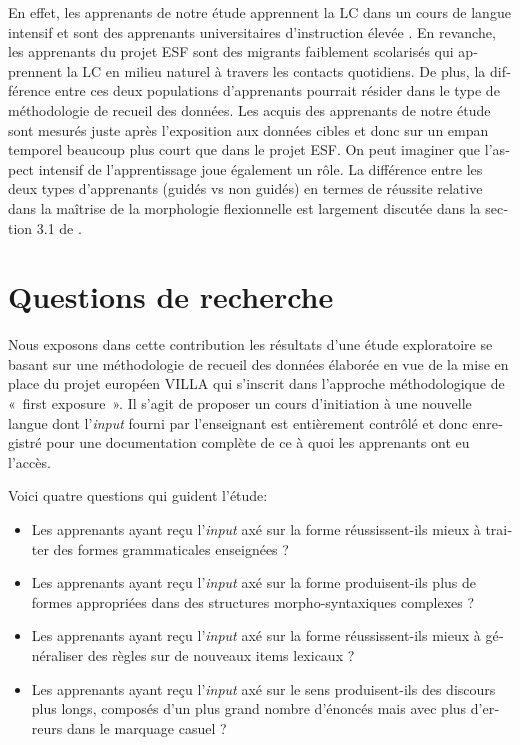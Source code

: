 \documentclass[output=paper]{langscibook}
\begin{document}
\begin{otherlanguage}{french}
En effet, les apprenants de notre étude apprennent la LC dans un cours de langue intensif et sont des apprenants universitaires d’instruction élevée \citep{Bartning1997}. En revanche, les apprenants du projet ESF sont des migrants faiblement scolarisés qui apprennent la LC en milieu naturel à travers les contacts quotidiens. De plus, la différence entre ces deux populations d’apprenants pourrait résider dans le type de méthodologie de recueil des données. Les acquis des apprenants de notre étude sont mesurés juste après l’exposition aux données cibles et donc sur un empan temporel beaucoup plus court que dans le projet ESF. On peut imaginer que l’aspect intensif de l’apprentissage joue également un rôle. La différence entre les deux types d’apprenants (guidés vs non guidés) en termes de réussite relative dans la maîtrise de la morphologie flexionnelle est largement discutée dans la section 3.1 de \citet{WatorekEtAl2021}.


\section{Questions de recherche}\label{sec:watorek:3}

Nous exposons dans cette contribution les résultats d’une étude exploratoire se basant sur une méthodologie de recueil des données élaborée en vue de la mise en place du projet européen VILLA qui  s’inscrit dans l’approche méthodologique de «~first exposure~». Il s’agit de proposer un cours d’initiation à une nouvelle langue dont l’\textit{input} fourni par l’enseignant est entièrement contrôlé et donc enregistré pour une documentation complète de ce à quoi les apprenants ont eu l’accès. 

Voici quatre questions qui guident l’étude:

\begin{itemize}
\item Les apprenants ayant reçu l’\textit{input} axé sur la forme réussissent-ils mieux à traiter des formes grammaticales enseignées ?
\item Les apprenants ayant reçu l’\textit{input} axé sur la forme produisent-ils plus de formes appropriées dans des structures morpho-syntaxiques complexes ?
\item Les apprenants ayant reçu l’\textit{input} axé sur la forme réussissent-ils mieux à généraliser des règles sur de nouveaux items lexicaux ?
\item Les apprenants ayant reçu l’\textit{input} axé sur le sens produisent-ils des discours plus longs, composés d’un plus grand nombre d’énoncés mais avec plus d’erreurs dans le marquage casuel ?
\end{itemize}


\end{otherlanguage}
\end{document}
